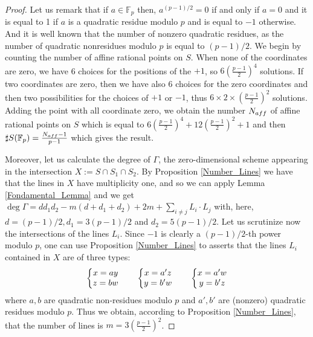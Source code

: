 \documentclass[10pt,a4paper]{amsart}
\begin{document}
\begin{proof}
Let us remark that if $a\in{\mathbb F}_p$ then, $a^{(p-1)/2}=0$ if and only if $a=0$ and  it is equal to 1 if $a$ is a quadratic residue modulo $p$ and is equal to $-1$ otherwise. And it is well known that the number of nonzero quadratic residues, as the number of  quadratic nonresidues modulo $p$ is equal to $(p-1)/2$. We begin by counting the number of affine rational points on $S$. When none of the coordinates are zero, we have 6 choices for the positions of the $+1$, so $6(\frac{p-1}{2})^4$ solutions. If two coordinates are zero, then we have also 6 choices for the zero coordinates and then two possibilities for the choices of $+1$ or $-1$, thus $6\times 2 \times (\frac{p-1}{2})^2$ solutions. Adding the point with all coordinate zero, we obtain the number $N_{\rm aff}$ of affine rational points on $S$ which is equal to 
$6(\frac{p-1}{2})^4+12 (\frac{p-1}{2})^2+1$ and then $\sharp S({\mathbb F}_p) =\frac{N_{\rm aff}-1}{p-1}$ which gives the result.

Moreover, let us calculate the degree of $\Gamma$, the zero-dimensional scheme appearing in the intersection 
$X:=S\cap S_1\cap S_2$.
By Proposition \ref{Number_Lines} we have that the lines  
in $X$ have multiplicity one, and so we can apply
Lemma \ref{Fondamental_Lemma} and we get
$\deg\Gamma=dd_1d_2 - m(d+d_1+d_2)+2m+ \sum_{i \ne j} L_i\cdot L_j$
with, here, $d=(p-1)/2, d_1=3(p-1)/2$ and $d_2=5(p-1)/2$. Let us scrutinize now the intersections of the lines $L_i$.
Since $-1$ is clearly a $(p-1)/2$-th power modulo $p$, one can use
 Proposition \ref{Number_Lines} to asserts that the lines $L_i$ contained in  $X$
 are of three types:
\begin{equation*}
\left\{
\begin{matrix}
x = ay   \\
z = bw \cr
\end{matrix}
\right.
\qquad
\left\{
\begin{matrix}
x = a'z   \\
y = b'w\cr
\end{matrix}
\right. 
\qquad
\left\{
\begin{matrix}
x = a' w   \\
y = b'z \cr
\end{matrix}
\right. 
\end{equation*}
where $a,b$ are quadratic non-residues modulo $p$ and $a',b'$ are (nonzero) quadratic residues modulo $p$.
Thus we obtain, according to Proposition \ref{Number_Lines}, that  the number of lines is $m=3(\frac{p-1}{2})^2$.


\end{proof}
\end{document}
